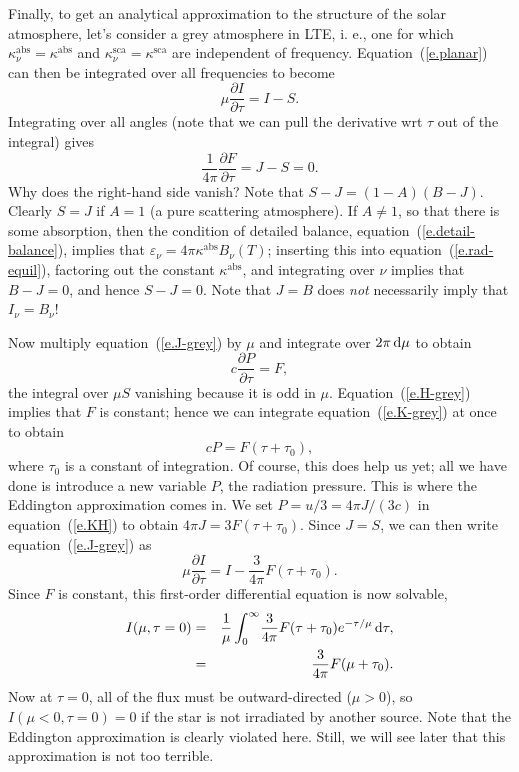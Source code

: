 Finally, to get an analytical approximation to the structure of the solar atmosphere, let's consider a grey atmosphere in LTE, i. e., one for which $\kappa_{\nu}^{\mathrm{abs}} = \kappa^{\mathrm{abs}}$ and $\kappa_{\nu}^{\mathrm{sca}} = \kappa^{\mathrm{sca}}$ are independent of frequency. Equation~(\ref{e.planar}) can then be integrated over all frequencies to become
\begin{equation}\label{e.J-grey}
\mu\frac{\partial I}{\partial\tau} = I-S.
\end{equation}
Integrating over all angles (note that we can pull the derivative wrt $\tau$ out of the integral) gives
\begin{equation}\label{e.H-grey}
\frac{1}{4\pi}\frac{\partial F}{\partial\tau} = J - S = 0.
\end{equation}
Why does the right-hand side vanish? Note that $S-J = (1-A)(B-J)$.  Clearly $S = J$ if $A = 1$ (a pure scattering atmosphere).  If $A \ne 1$, so that there is some absorption, then the condition of detailed balance, equation~(\ref{e.detail-balance}), implies that $\varepsilon_{\nu} = 4\pi\kappa^{\mathrm{abs}}B_{\nu}(T)$; inserting this into equation~(\ref{e.rad-equil}), factoring out the constant $\kappa^{\mathrm{abs}}$, and integrating over $\nu$ implies that $B - J = 0$, and hence $S - J = 0$. Note that $J = B$ does \emph{not} necessarily imply that $I_{\nu} = B_{\nu}$!

Now multiply equation~(\ref{e.J-grey}) by $\mu$ and integrate over $2\pi\,\mathrm{d}\mu$ to obtain
\begin{equation}\label{e.K-grey}
c\frac{\partial P}{\partial\tau} = F,
\end{equation}
the integral over $\mu S$ vanishing because it is odd in $\mu$. Equation~(\ref{e.H-grey}) implies that $F$ is constant; hence we can integrate equation~(\ref{e.K-grey}) at once to obtain
\begin{equation}\label{e.KH}
cP = F(\tau + \tau_{0}),
\end{equation}
where $\tau_{0}$ is a constant of integration. Of course, this does help us yet; all we have done is introduce a new variable $P$, the radiation pressure. This is where the Eddington approximation comes in.  We set $P = u/3 = 4\pi J/(3c)$ in equation~(\ref{e.KH}) to obtain $4\pi J = 3F(\tau + \tau_{0})$. Since $J = S$, we can then write equation~(\ref{e.J-grey}) as
\begin{equation}
\mu\frac{\partial I}{\partial\tau} = I - \frac{3}{4\pi}F(\tau+\tau_{0}).
\end{equation}
Since $F$ is constant, this first-order differential equation is now solvable,
\begin{eqnarray}
I(\mu,\tau=0) &=& \frac{1}{\mu}\int_{0}^{\infty}\!\frac{3}{4\pi}F(\tau + \tau_{0}) e^{-\tau/\mu}\,\mathrm{d}\tau,\nonumber\\
  &=& \frac{3}{4\pi}F(\mu + \tau_{0}).\label{e.I-Edd}
\end{eqnarray}
Now at $\tau = 0$, all of the flux must be outward-directed ($\mu >0$), so $I(\mu < 0,\tau = 0) = 0$ if the star is not irradiated by another source.  Note that the Eddington approximation is clearly violated here.  Still, we will see later that this approximation is not too terrible. 

